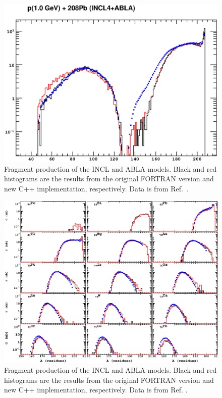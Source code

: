 \documentclass[a4paper]{jpconf}
\begin{document}
\begin{figure}[h]
\begin{center}
\includegraphics[scale=0.80]{poster/images/fragments.eps}

\caption{Fragment production of the INCL and ABLA \cite{abla, abla1, abla2} models. 
Black and red histograms are the results from the original FORTRAN version 
and new C++ implementation, respectively. Data is from Ref.~\cite{gsifragments}.}

\end{center}
\end{figure}


\begin{figure}[h]
\begin{center}
\includegraphics[scale=0.60]{poster/images/pPbIsotopes.eps}

\caption{Fragment production of the INCL and ABLA \cite{abla, abla1, abla2} models. 
Black and red histograms are the results from the original FORTRAN version 
and new C++ implementation, respectively. Data is from Ref. \cite{gsifragments}.}

\end{center}
\end{figure}
\end{document}
